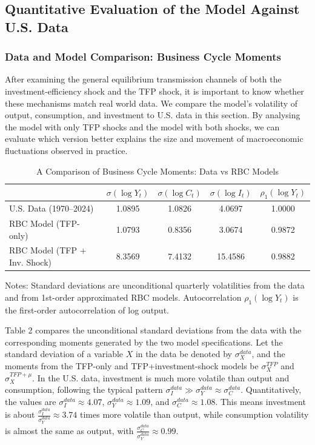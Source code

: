 \documentclass[12pt]{article}
\begin{document}
\subsection{Quantitative Evaluation of the Model Against U.S. Data}
\subsubsection{Data and Model Comparison: Business Cycle Moments}
After examining the general equilibrium transmission channels of both the investment-efficiency shock and the TFP shock, it is important to know whether these mechanisms match real world data. We compare the model’s volatility of output, consumption, and investment to U.S. data in this section.
By analysing the model with only TFP shocks and the model with both shocks, we can evaluate which version better explains the size and movement of macroeconomic fluctuations observed in practice.  


\begin{table}[H]
\centering
\caption{A Comparison of Business Cycle Moments: Data vs RBC Models}
\begin{tabular}{lcccc}
\hline\hline
 & $\sigma(\log Y_t)$ & $\sigma(\log C_t)$ & $\sigma(\log I_t)$ & $\rho_1(\log Y_t)$ \\
\hline
{U.S. Data (1970--2024)} 
 & 1.0895 & 1.0826 & 4.0697 & 1.0000 \\[4pt]

{RBC Model (TFP-only)}
 & 1.0793 & 0.8356 & 3.0674 & 0.9872 \\

{RBC Model (TFP + Inv. Shock)}
 & 8.3569 & 7.4132 & 15.4586 & 0.9882 \\
\hline\hline
\end{tabular}
\begin{flushleft}
\footnotesize Notes: Standard deviations are unconditional quarterly volatilities from the data and from 1st-order approximated RBC models. Autocorrelation $\rho_1(\log Y_t)$ is the first-order autocorrelation of log output. 
\end{flushleft}
\end{table}

Table 2 compares the unconditional standard deviations from the data with the corresponding moments generated by the two model specifications. Let the standard deviation of a variable $X$ in the data be denoted by $\sigma_X^{data}$, and the moments from the TFP-only and TFP+investment-shock models be $\sigma_X^{TFP}$ and $\sigma_X^{TFP+\mu}$. In the U.S. data, investment is much more volatile than output and consumption, following the typical pattern $\sigma_I^{data} \gg \sigma_Y^{data} \approx \sigma_C^{data}$. Quantitatively, the values are $\sigma_I^{data} \approx 4.07$, $\sigma_Y^{data} \approx 1.09$, and $\sigma_C^{data} \approx 1.08$. This means investment is about $\frac{\sigma_I^{data}}{\sigma_Y^{data}} \approx 3.74$ times more volatile than output, while consumption volatility is almost the same as output, with $\frac{\sigma_C^{data}}{\sigma_Y^{data}} \approx 0.99$.
\end{document}
